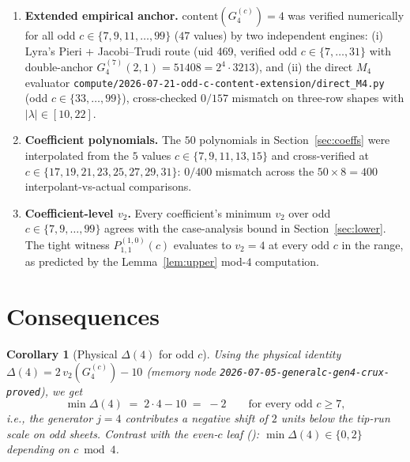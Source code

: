 \documentclass[11pt]{article}
\newtheorem{corollary}[theorem]{Corollary}
\begin{document}
\begin{enumerate}
\item \textbf{Extended empirical anchor.} $\mathrm{content}(G_4^{(c)}) = 4$ was
      verified numerically for all odd $c \in \{7, 9, 11, \ldots, 99\}$ ($47$
      values) by two independent engines: (i) Lyra's Pieri +
      Jacobi--Trudi route (uid 469, verified odd $c \in \{7, \ldots, 31\}$
      with double-anchor $G_4^{(7)}(2, 1) = 51408 = 2^4 \cdot 3213$), and
      (ii) the direct $M_4$ evaluator
      \texttt{compute/2026-07-21-odd-c-content-extension/direct\_M4.py} (odd $c \in \{33, \ldots, 99\}$),
      cross-checked $0/157$ mismatch on three-row shapes with $|\lambda| \in [10, 22]$.
\item \textbf{Coefficient polynomials.} The $50$ polynomials in
      Section~\ref{sec:coeffs} were interpolated from the $5$ values
      $c \in \{7, 9, 11, 13, 15\}$ and cross-verified at
      $c \in \{17, 19, 21, 23, 25, 27, 29, 31\}$: $0/400$ mismatch across the
      $50 \times 8 = 400$ interpolant-vs-actual comparisons.
\item \textbf{Coefficient-level $v_2$.} Every coefficient's minimum $v_2$ over
      odd $c \in \{7, 9, \ldots, 99\}$ agrees with the case-analysis bound in
      Section~\ref{sec:lower}. The tight witness $P^{(1,0)}_{1,1}(c)$ evaluates
      to $v_2 = 4$ at every odd $c$ in the range, as predicted by the
      Lemma~\ref{lem:upper} mod-$4$ computation.
\end{enumerate}

\section{Consequences}

\begin{corollary}[Physical $\Delta(4)$ for odd $c$]
Using the physical identity $\Delta(4) = 2\,v_2(G_4^{(c)}) - 10$
(memory node \texttt{2026-07-05-generalc-gen4-crux-proved}), we get
\[
  \min \Delta(4) \;=\; 2 \cdot 4 - 10 \;=\; -2 \qquad \text{for every odd } c \ge 7,
\]
i.e., the generator $j = 4$ contributes a negative shift of $2$ units below
the tip-run scale on odd sheets. Contrast with the even-$c$ leaf
(\cite{clio2026capidentity}): $\min \Delta(4) \in \{0, 2\}$ depending on
$c \bmod 4$.
\end{corollary}
\end{document}
